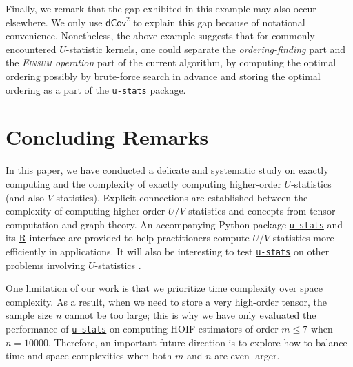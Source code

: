 \documentclass[sn-mathphys, natbib=false]{sn-jnl}
\newcommand{\libref}[2]{\href{#2}{\texttt{#1}}}
\def\package{\libref{u-stats}{https://github.com/zrq1706/U-Statistics-Python}}
\theoremstyle{plain}
\theoremstyle{definition}
\def\Einsum{\textsc{Einsum}}
\newcommand{\Lin}[1]{{\color{purple}{#1}}}
\def\package{\libref{u-stats}{https://github.com/zrq1706/U-Statistics-Python}}
\begin{document}
\begin{bibunit}[agsm]
\Lin{to add}

Finally, we remark that the gap exhibited in this example may also occur elsewhere. We only use $\mathsf{dCov}^{2}$ to explain this gap because of notational convenience. Nonetheless, the above example suggests that for commonly encountered $U$-statistic kernels, one could separate the \emph{ordering-finding} part and the \emph{\Einsum{} operation} part of the current algorithm, by computing the optimal ordering possibly by brute-force search in advance and storing the optimal ordering as a part of the \package{} package.
\fi



\section{Concluding Remarks}
\label{sec:conclusions}

In this paper, we have conducted a delicate and systematic study on exactly computing and the complexity of exactly computing higher-order $U$-statistics (and also $V$-statistics). Explicit connections are established between the complexity of computing higher-order $U$/$V$-statistics and concepts from tensor computation and graph theory. An accompanying Python package \package{} and its \href{https://github.com/cxy0714/U-Statistics-R}{R} interface are provided to help practitioners compute $U$/$V$-statistics more efficiently in applications. %
It will also be interesting to test \package{} on other problems involving $U$-statistics \citep{shen2025engression}. 

One limitation of our work is that we prioritize time complexity over space complexity. As a result, when we need to store a very high-order tensor, the sample size $n$ cannot be too large; this is why we have only evaluated the performance of \package{} on computing HOIF estimators of order $m \leq 7$ when $n = 10000$. %
Therefore, an important future direction is to explore how to balance time and space complexities when both $m$ and $n$ are even larger.



\end{bibunit}
\end{document}
